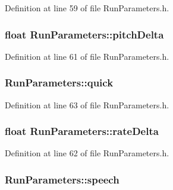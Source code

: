 Definition at line 59 of file Run\+Parameters.\+h.

\subsubsection[{\texorpdfstring{pitch\+Delta}{pitchDelta}}]{\setlength{\rightskip}{0pt plus 5cm}float Run\+Parameters\+::pitch\+Delta}\hypertarget{class_run_parameters_a84894f575f0d17ed4b7930549b08cafc}{}\label{class_run_parameters_a84894f575f0d17ed4b7930549b08cafc}


Definition at line 61 of file Run\+Parameters.\+h.

\subsubsection[{\texorpdfstring{quick}{quick}}]{ Run\+Parameters\+::quick}\hypertarget{class_run_parameters_ad8b6187b7f1f64bcbd9e7e4ce524bafb}{}\label{class_run_parameters_ad8b6187b7f1f64bcbd9e7e4ce524bafb}


Definition at line 63 of file Run\+Parameters.\+h.

\subsubsection[{\texorpdfstring{rate\+Delta}{rateDelta}}]{\setlength{\rightskip}{0pt plus 5cm}float Run\+Parameters\+::rate\+Delta}\hypertarget{class_run_parameters_ae0ed68209b3117dd1f76fbf8c707abe8}{}\label{class_run_parameters_ae0ed68209b3117dd1f76fbf8c707abe8}


Definition at line 62 of file Run\+Parameters.\+h.

\subsubsection[{\texorpdfstring{speech}{speech}}]{ Run\+Parameters\+::speech}\hypertarget{class_run_parameters_a61b3a50c1db33d73133fa53bbabf1cb2}{}\label{class_run_parameters_a61b3a50c1db33d73133fa53bbabf1cb2}


